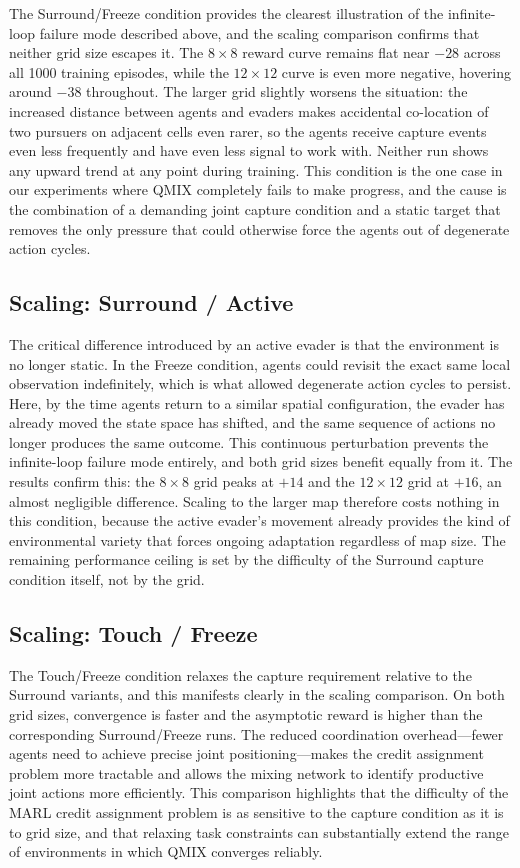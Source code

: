 \documentclass[sigconf,screen]{acmart}
\begin{document}
The Surround/Freeze condition provides the clearest illustration of the infinite-loop failure mode described above, and the scaling comparison confirms that neither grid size escapes it. The $8{\times}8$ reward curve remains flat near $-28$ across all 1000 training episodes, while the $12{\times}12$ curve is even more negative, hovering around $-38$ throughout. The larger grid slightly worsens the situation: the increased distance between agents and evaders makes accidental co-location of two pursuers on adjacent cells even rarer, so the agents receive capture events even less frequently and have even less signal to work with. Neither run shows any upward trend at any point during training. This condition is the one case in our experiments where QMIX completely fails to make progress, and the cause is the combination of a demanding joint capture condition and a static target that removes the only pressure that could otherwise force the agents out of degenerate action cycles.

\subsection{Scaling: Surround / Active}


The critical difference introduced by an active evader is that the environment is no longer static. In the Freeze condition, agents could revisit the exact same local observation indefinitely, which is what allowed degenerate action cycles to persist. Here, by the time agents return to a similar spatial configuration, the evader has already moved the state space has shifted, and the same sequence of actions no longer produces the same outcome. This continuous perturbation prevents the infinite-loop failure mode entirely, and both grid sizes benefit equally from it. The results confirm this: the $8{\times}8$ grid peaks at $+14$ and the $12{\times}12$ grid at $+16$, an almost negligible difference. Scaling to the larger map therefore costs nothing in this condition, because the active evader's movement already provides the kind of environmental variety that forces ongoing adaptation regardless of map size. The remaining performance ceiling is set by the difficulty of the Surround capture condition itself, not by the grid.

\subsection{Scaling: Touch / Freeze}


The Touch/Freeze condition relaxes the capture requirement relative to the Surround variants, and this manifests clearly in the scaling comparison. On both grid sizes, convergence is faster and the asymptotic reward is higher than the corresponding Surround/Freeze runs. The reduced coordination overhead—fewer agents need to achieve precise joint positioning—makes the credit assignment problem more tractable and allows the mixing network to identify productive joint actions more efficiently. This comparison highlights that the difficulty of the MARL credit assignment problem is as sensitive to the capture condition as it is to grid size, and that relaxing task constraints can substantially extend the range of environments in which QMIX converges reliably.
\end{document}
